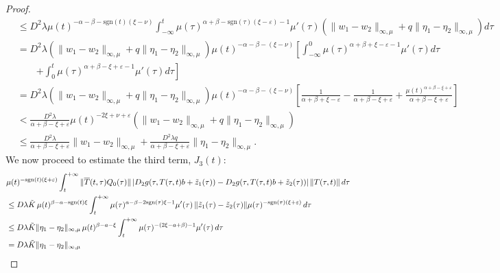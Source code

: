 \documentclass[9pt]{amsart}
\numberwithin{equation}{section}
\numberwithin{lemma}{section}
\begin{document}
\begin{proof}
{\begin{align*}
%
&\leq D^2 \lambda \mu(t)^{-\alpha - \beta - \text{sgn}(t)(\xi - \nu)} 
\int_{-\infty}^{t} 
  \mu(\tau)^{\alpha + \beta - \text{sgn}(\tau)(\xi - \varepsilon) - 1} \mu'(\tau) 
  \left( 
    \|w_1 - w_2\|_{\infty,\mu} + q \|\eta_1 - \eta_2\|_{\infty,\mu} 
  \right) d\tau \\
%
&= D^2 \lambda \left( 
    \|w_1 - w_2\|_{\infty,\mu} + q \|\eta_1 - \eta_2\|_{\infty,\mu} 
  \right) \mu(t)^{-\alpha - \beta - (\xi - \nu)} 
\left[
  \int_{-\infty}^{0} \mu(\tau)^{\alpha + \beta + \xi - \varepsilon - 1} \mu'(\tau) d\tau \right. \\
&\qquad\left. + \int_0^t \mu(\tau)^{\alpha + \beta - \xi + \varepsilon - 1} \mu'(\tau) d\tau
\right] \\
%
&= D^2 \lambda \left( 
    \|w_1 - w_2\|_{\infty,\mu} + q \|\eta_1 - \eta_2\|_{\infty,\mu} 
  \right) \mu(t)^{-\alpha - \beta - (\xi - \nu)} 
\left[
  \frac{1}{\alpha + \beta + \xi - \varepsilon} 
  - \frac{1}{\alpha + \beta - \xi + \varepsilon} 
  + \frac{\mu(t)^{\alpha + \beta - \xi + \varepsilon}}{\alpha + \beta - \xi + \varepsilon} 
\right] \\
%
&< \frac{D^2 \lambda}{\alpha + \beta - \xi + \varepsilon} 
   \mu(t)^{-2\xi + \nu + \varepsilon} 
   \left( 
     \|w_1 - w_2\|_{\infty,\mu} + q \|\eta_1 - \eta_2\|_{\infty,\mu} 
   \right) \\
%
&\leq \frac{D^2 \lambda}{\alpha + \beta - \xi + \varepsilon} 
      \|w_1 - w_2\|_{\infty,\mu} 
      + \frac{D^2 \lambda q}{\alpha + \beta - \xi + \varepsilon} 
      \|\eta_1 - \eta_2\|_{\infty,\mu}.
\end{align*}}
We now proceed to estimate the third term, \(J_3(t)\):
\begin{align*}
&\mu(t)^{-\textnormal{sgn}(t)(\xi + \varepsilon)} 
\int_t^{+\infty} 
  \|\overline{T}(t,\tau) Q_0(\tau)\| 
  \left| D_2g(\tau, T(\tau,t)b + \tilde{z}_1(\tau)) 
       - D_2g(\tau, T(\tau,t)b + \tilde{z}_2(\tau)) \right| 
  \|T(\tau,t)\| \, d\tau \\
%
&\leq D \lambda \tilde{K} \, \mu(t)^{\beta - a - \textnormal{sgn}(t)\xi} 
\int_t^{+\infty} 
  \mu(\tau)^{a - \beta - 2\textnormal{sgn}(\tau)\xi - 1} \mu'(\tau) \,
  \|\tilde{z}_1(\tau) - \tilde{z}_2(\tau)\| 
  \mu(\tau)^{-\textnormal{sgn}(\tau)(\xi + \varepsilon)} \, d\tau \\
%
&\leq D \lambda \tilde{K} \|\eta_1 - \eta_2\|_{\infty,\mu} 
    \, \mu(t)^{\beta - a - \xi} 
\int_t^{+\infty} 
    \mu(\tau)^{-(2\xi - a + \beta) - 1} \mu'(\tau) \, d\tau \\
%
&= D \lambda \tilde{K} \|\eta_1 - \eta_2\|_{\infty,\mu} 

\end{align*}
\end{proof}
\end{document}
